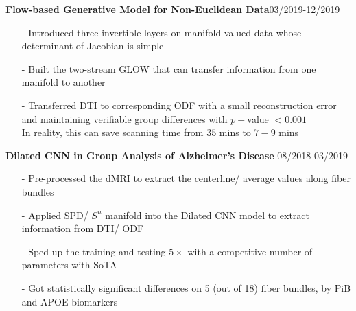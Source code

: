 \documentclass[margin]{res}
\begin{document}
\begin{resume}
                \textbf{Flow-based Generative Model for Non-Euclidean Data}\hfill 03/2019-12/2019
                \begin{itemize}\itemsep -2.2pt %
                 \item[-] Introduced three invertible layers on manifold-valued data whose determinant of Jacobian is simple
                 \item[-] Built the two-stream GLOW that can transfer information from one manifold to another
                 \item[-] Transferred DTI to corresponding ODF with a small reconstruction error and maintaining verifiable group differences with $p-$value $<0.001$\\ 
                 In reality, this can save scanning time from $35$ mins to $7-9$ mins
                 \end{itemize}

                 \vspace{-1em}  


                \textbf{Dilated CNN in Group Analysis of Alzheimer's Disease} \hfill 08/2018-03/2019
                \begin{itemize}\itemsep -2.2pt %
                 \item[-] Pre-processed the dMRI to extract the centerline/ average values along fiber bundles
                 \item[-] Applied SPD/ $S^n$ manifold into the Dilated CNN model to extract information from DTI/ ODF
                 \item[-] Sped up the training and testing $5\times$ with a competitive number of parameters with SoTA
                 \item[-] Got statistically significant differences on 5 (out of 18) fiber bundles, by PiB and APOE biomarkers
                 \end{itemize}


\end{resume}
\end{document}
